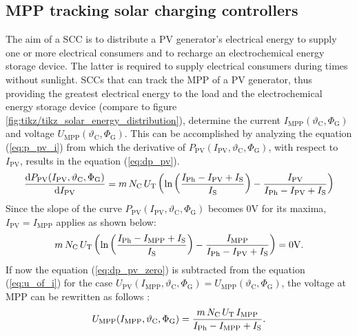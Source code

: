 \subsection{MPP tracking solar charging controllers}
The aim of a SCC is to distribute a PV generator's electrical energy to supply one or more electrical consumers and to recharge an electrochemical energy storage device. The latter is required to supply electrical consumers during times without sunlight. SCCs that can track the MPP of a PV generator, thus providing the greatest electrical energy to the load and the electrochemical energy storage device (compare to figure \ref{fig:tikz/tikz_solar_energy_distribution}), determine the current $I_{\mathrm{MPP}}(\vartheta_{\mathrm{C}}, \Phi_{\mathrm{G}})$ and voltage $U_{\mathrm{MPP}}(\vartheta_{\mathrm{C}}, \Phi_{\mathrm{G}})$. This can be accomplished by analyzing the equation (\ref{eq:p_pv_i}) from which the derivative of $P_{\mathrm{PV}}(I_{\mathrm{PV}}, \vartheta_{\mathrm{C}}, \Phi_{\mathrm{G}})$, with respect to $I_{\mathrm{PV}}$, results in the equation (\ref{eq:dp_pv}).
	\begin{equation} \label{eq:dp_pv}
	\centering
		 \dfrac{\mathrm d P_{\mathrm{PV}}(I_{\mathrm{PV}}, \vartheta_{\mathrm{C}}, \Phi_{\mathrm{G}})}{\mathrm d I_{\mathrm{PV}}} = m \, N_{\mathrm{C}} \, U_{\mathrm{T}} \left( \ln \left( \frac{I_{\mathrm{Ph}} - I_{\mathrm{PV}} + I_{\mathrm{S}}}{I_{\mathrm{S}}} \right) - \frac{I_{\mathrm{PV}}}{I_{\mathrm{Ph}} - I_{\mathrm{PV}} + I_{\mathrm{S}}} \right)
	\end{equation}
Since the slope of the curve $P_{\mathrm{PV}}(I_{\mathrm{PV}}, \vartheta_{\mathrm{C}}, \Phi_{\mathrm{G}})$ becomes $0\mathrm{V}$ for its maxima, $I_{\mathrm{PV}} = I_{\mathrm{MPP}}$ applies as shown below:
	\begin{equation} \label{eq:dp_pv_zero}
	\centering
		 m \, N_{\mathrm{C}} \, U_{\mathrm{T}} \left( \ln \left( \frac{I_{\mathrm{Ph}} - I_{\mathrm{MPP}} + I_{\mathrm{S}}}{I_{\mathrm{S}}} \right) - \frac{I_{\mathrm{MPP}}}{I_{\mathrm{Ph}} - I_{\mathrm{PV}} + I_{\mathrm{S}}} \right) = 0\mathrm{V} \text{.}
	\end{equation}
If now the equation (\ref{eq:dp_pv_zero}) is subtracted from the equation (\ref{eq:u_of_i}) for the case $U_{\mathrm{PV}}(I_{\mathrm{MPP}}, \vartheta_{\mathrm{C}}, \Phi_{\mathrm{G}}) = U_{\mathrm{MPP}}(\vartheta_{\mathrm{C}}, \Phi_{\mathrm{G}})$, the voltage at MPP can be rewritten as follows \cite{Mertens:2015, Wagner:2018}:
	\begin{equation} \label{eq:u_mpp_i_mpp}
	\centering
		 U_{\mathrm{MPP}}(I_{\mathrm{MPP}}, \vartheta_{\mathrm{C}}, \Phi_{\mathrm{G}}) = \frac{m \, N_{\mathrm{C}} \, U_{\mathrm{T}} \, I_{\mathrm{MPP}}}{I_{\mathrm{Ph}} - I_{\mathrm{MPP}} + I_{\mathrm{S}}} \text{.}
	\end{equation}

